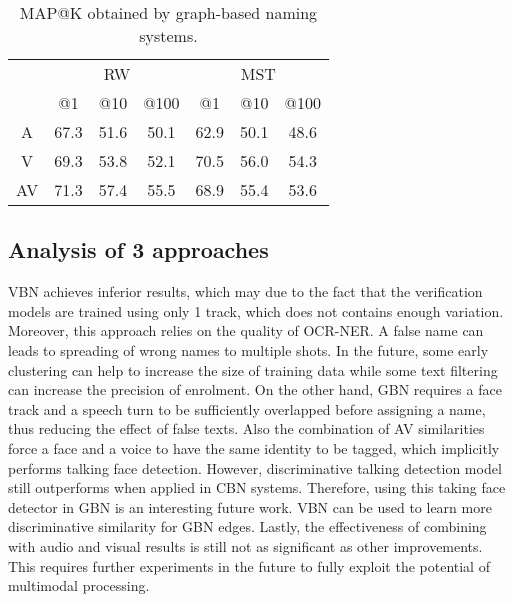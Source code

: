 \begin{table}[tb]
\centering
\caption{MAP@K obtained by graph-based naming systems.}
\vspace*{-2mm}
\begin{tabular}{c|c|c|c|| c|c|c|}
\cline{2-7}
  &  \multicolumn{3}{|c||}{RW} &  \multicolumn{3}{|c|}{MST} \\ \cline{2-7}
           & @1& @10& @100   & @1& @10& @100 \\ \hline
 \multicolumn{1}{|c|}{A} & 67.3 &  51.6 & 50.1  & 62.9 &  50.1 & 48.6\\ \hline
 \multicolumn{1}{|c|}{V} & 69.3  & 53.8 & 52.1 & 70.5  & 56.0 & 54.3\\ \hline
 \multicolumn{1}{|c|}{AV} & 71.3 &  57.4 & 55.5 &  68.9 &  55.4 & 53.6\\ \hline
\end{tabular}
\vspace*{-5mm}
\label{tab:graph}
\end{table}

\subsection{Analysis of 3 approaches}

VBN achieves inferior results, which may due to the fact that the verification models are trained using only 1 track, which does not contains enough variation. 
%
Moreover, this approach relies on the quality of OCR-NER. A false name can leads to spreading of wrong names to multiple shots. In the future, some early clustering can help to increase the size of training data while some text filtering can increase the precision of enrolment.
%
On the other hand, GBN requires a face track and a speech turn to be sufficiently overlapped before assigning a name, thus reducing the effect of false texts. Also the combination of AV similarities force a face and a voice to have the same identity to be tagged, which implicitly performs talking face detection.
%
However, discriminative talking detection model still outperforms when applied in CBN systems. Therefore, using this taking face detector in GBN is an interesting future work. 
%
VBN can be used to learn more discriminative similarity for GBN edges.
%
Lastly, the effectiveness of combining with audio and visual results is still not as significant as other improvements. This requires further experiments in the future to fully exploit the potential of multimodal processing.

